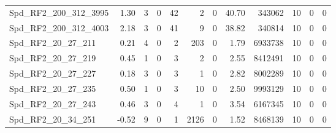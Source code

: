 \begin{longtable}[c]{@{}lrrrrrrrrrrr@{}}
Spd\_RF2\_200\_312\_3995      & 1.30                   & 3                       & 0                       & 42                     & 2                       & 0                       & 40.70                   & 343062                   & 10                       & 0                        & 0                        \\
Spd\_RF2\_200\_312\_4003      & 2.18                   & 3                       & 0                       & 41                     & 9                       & 0                       & 38.82                   & 340814                   & 10                       & 0                        & 0                        \\
Spd\_RF2\_20\_27\_211         & 0.21                   & 4                       & 0                       & 2                      & 203                     & 0                       & 1.79                    & 6933738                  & 10                       & 0                        & 0                        \\
Spd\_RF2\_20\_27\_219         & 0.45                   & 1                       & 0                       & 3                      & 2                       & 0                       & 2.55                    & 8412491                  & 10                       & 0                        & 0                        \\
Spd\_RF2\_20\_27\_227         & 0.18                   & 3                       & 0                       & 3                      & 1                       & 0                       & 2.82                    & 8002289                  & 10                       & 0                        & 0                        \\
Spd\_RF2\_20\_27\_235         & 0.50                   & 1                       & 0                       & 3                      & 10                      & 0                       & 2.50                    & 9993129                  & 10                       & 0                        & 0                        \\
Spd\_RF2\_20\_27\_243         & 0.46                   & 3                       & 0                       & 4                      & 1                       & 0                       & 3.54                    & 6167345                  & 10                       & 0                        & 0                        \\
Spd\_RF2\_20\_34\_251         & -0.52                  & 9                       & 0                       & 1                      & 2126                    & 0                       & 1.52                    & 8468139                  & 10                       & 0                        & 0                        \\

\end{longtable}
